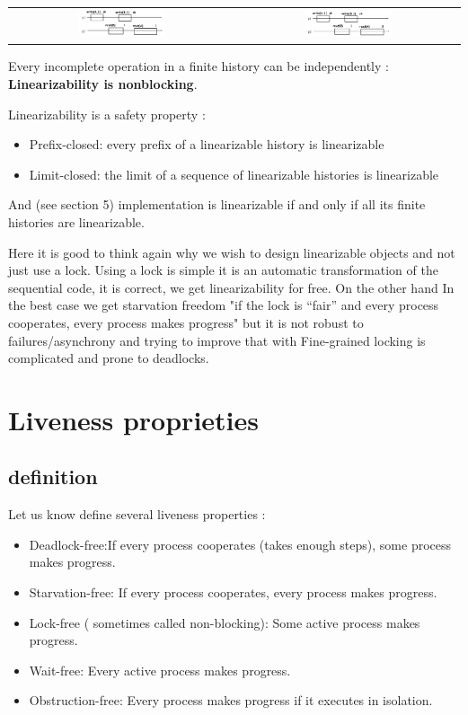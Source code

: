 \documentclass{article}
\theoremstyle{definition}
\begin{document}
\begin{center}
\begin{tabular}{c c}
\includegraphics[width=0.4\textwidth]{compos}&
\includegraphics[width=0.4\textwidth]{not_compos}
\end{tabular}
\end{center}

Every incomplete operation in a finite history can be independently  : \textbf{Linearizability is nonblocking}.

Linearizability is a safety property :
\begin{itemize}
\item Prefix-closed: every prefix of a linearizable history is linearizable
\item Limit-closed: the limit of a sequence of linearizable histories is linearizable
\end{itemize}
And (see section 5) implementation is linearizable if and only if all its finite histories are linearizable.

Here it is good to think again why we wish to design linearizable objects and not just use a lock. Using a lock is simple it is an automatic transformation of the sequential code, it is correct, we get linearizability for free. On the other hand In the best case we get starvation freedom "if the lock is “fair” and every process cooperates, every process makes progress" but it is not robust to failures/asynchrony and trying to improve that with Fine-grained locking is complicated and prone to deadlocks.

\section{Liveness proprieties}

\subsection{definition}

Let us know define several liveness properties :
\begin{itemize}
\item Deadlock-free:If every process cooperates (takes enough steps), some process makes progress.
\item Starvation-free: If every process cooperates, every process makes progress.
\item Lock-free ( sometimes called non-blocking): Some active process makes progress.
\item Wait-free: Every active process makes progress.
\item Obstruction-free: Every process makes progress if it executes in isolation.
\end{itemize}
\end{document}

